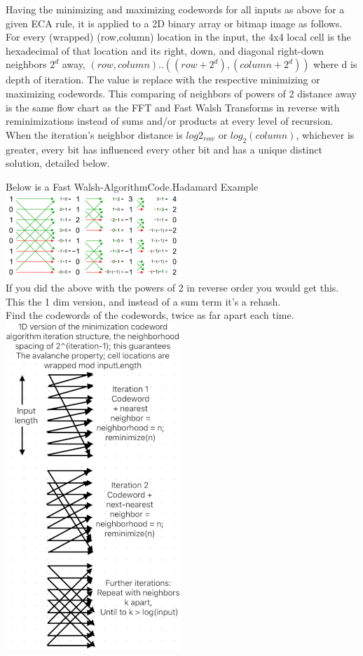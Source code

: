 \documentclass[11pt]{article}
\begin{document}
Having the minimizing and maximizing codewords for all inputs as above for a given ECA rule, it is applied to a 2D binary array or bitmap image as follows. For every (wrapped) (row,column) location in the input, the 4x4 local cell is the hexadecimal of that location and its right, down, and diagonal right-down neighbors $2^d$ away, $(row,column)..((row+2^d),(column+2^d))$  where d is depth of iteration. The value is replace with the respective minimizing or maximizing codewords. This comparing of neighbors of powers of 2 distance away is the same flow chart as the FFT and Fast Walsh Transforms in reverse with reminimizations instead of sums and/or products at every level of recursion. When the iteration's neighbor distance is $log2_{row}$ or $log_2(column)$, whichever is greater, every bit has influenced every other bit and has a unique distinct solution, detailed below. \\
\begin{center}
Below is a Fast Walsh-AlgorithmCode.Hadamard Example \cite{enwiki:1261916659}\\
\includegraphics{FastWalshHadamard}\\
If you did the above with the powers of 2 in reverse order you would get this. \\
This the 1 dim version, and instead of a sum term it's a rehash.\\ 
Find the codewords of the codewords, twice as far apart each time.\\
\includegraphics{AlgoStruct}\\
\end{center}
\end{document}
